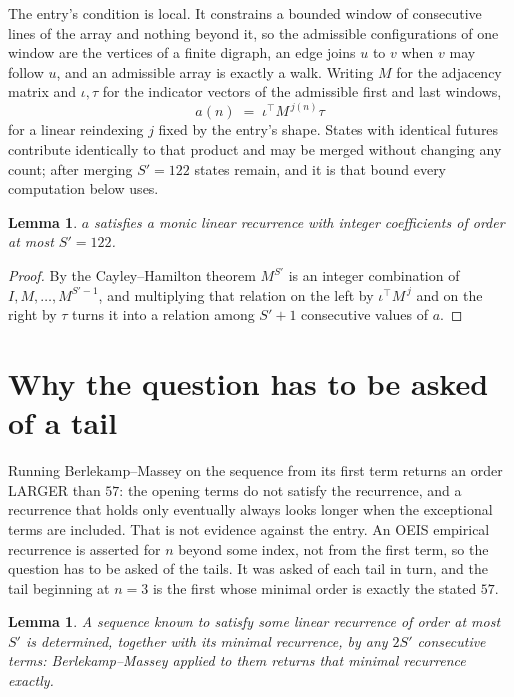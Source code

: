 \documentclass[11pt,a4paper]{article}
\theoremstyle{plain}
\newtheorem{lemma}[theorem]{Lemma}
\theoremstyle{definition}
\begin{document}
The entry's condition is local. It constrains a bounded window of consecutive lines of the
array and nothing beyond it, so the admissible configurations of one window are the vertices of
a finite digraph, an edge joins $u$ to $v$ when $v$ may follow $u$, and an admissible array is
exactly a walk. Writing $M$ for the adjacency matrix and $\iota,\tau$ for the indicator vectors
of the admissible first and last windows,
\[
a(n)\;=\;\iota^{\!\top}M^{\,j(n)}\tau
\]
for a linear reindexing $j$ fixed by the entry's shape. States with identical futures
contribute identically to that product and may be merged without changing any count; after
merging $S'=122$ states remain, and it is that bound every computation below uses.

\begin{lemma}\label{lem:cf}
$a$ satisfies a monic linear recurrence with integer coefficients of order at most $S'=122$.
\end{lemma}

\begin{proof}
By the Cayley--Hamilton theorem $M^{S'}$ is an integer combination of $I,M,\dots,M^{S'-1}$,
and multiplying that relation on the left by $\iota^{\!\top}M^{\,j}$ and on the right by
$\tau$ turns it into a relation among $S'+1$ consecutive values of $a$.
\end{proof}

\section{Why the question has to be asked of a tail}

Running Berlekamp--Massey on the sequence from its first term returns an order LARGER than $57$: the opening terms do not satisfy the recurrence, and a recurrence that holds only eventually always looks longer when the exceptional terms are included. That is not evidence against the entry. An OEIS empirical recurrence is asserted for $n$ beyond some index, not from the first term, so the question has to be asked of the tails. It was asked of each tail in turn, and the tail beginning at $n=3$ is the first whose minimal order is exactly the stated $57$.

\begin{lemma}\label{lem:bm}
A sequence known to satisfy some linear recurrence of order at most $S'$ is determined,
together with its minimal recurrence, by any $2S'$ consecutive terms: Berlekamp--Massey applied
to them returns that minimal recurrence exactly.
\end{lemma}
\end{document}
